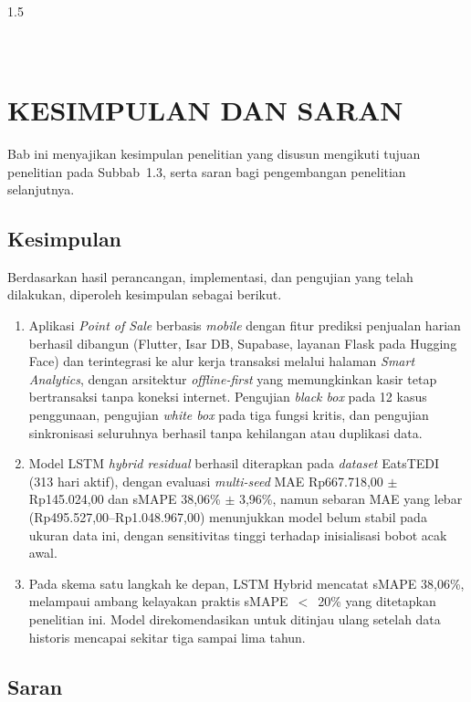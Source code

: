 \documentclass[12pt, a4paper, onecolumn, oneside]{report}
\begin{document}
\begin{spacing}{1.5}
\chapter[KESIMPULAN DAN SARAN]{\\ KESIMPULAN DAN SARAN}

Bab ini menyajikan kesimpulan penelitian yang disusun mengikuti tujuan penelitian pada Subbab~1.3, serta saran bagi pengembangan penelitian selanjutnya.

\section{Kesimpulan}

Berdasarkan hasil perancangan, implementasi, dan pengujian yang telah dilakukan, diperoleh kesimpulan sebagai berikut.
\begin{enumerate}
    \item Aplikasi \textit{Point of Sale} berbasis \textit{mobile} dengan fitur prediksi penjualan harian berhasil dibangun (Flutter, Isar DB, Supabase, layanan Flask pada Hugging Face) dan terintegrasi ke alur kerja transaksi melalui halaman \textit{Smart Analytics}, dengan arsitektur \textit{offline-first} yang memungkinkan kasir tetap bertransaksi tanpa koneksi internet. Pengujian \textit{black box} pada 12 kasus penggunaan, pengujian \textit{white box} pada tiga fungsi kritis, dan pengujian sinkronisasi seluruhnya berhasil tanpa kehilangan atau duplikasi data.

    \item Model LSTM \textit{hybrid residual} berhasil diterapkan pada \textit{dataset} EatsTEDI (313 hari aktif), dengan evaluasi \textit{multi-seed} MAE Rp667.718,00 $\pm$ Rp145.024,00 dan sMAPE 38,06\% $\pm$ 3,96\%, namun sebaran MAE yang lebar (Rp495.527,00--Rp1.048.967,00) menunjukkan model belum stabil pada ukuran data ini, dengan sensitivitas tinggi terhadap inisialisasi bobot acak awal.

    \item Pada skema satu langkah ke depan, LSTM Hybrid mencatat sMAPE 38,06\%, melampaui ambang kelayakan praktis sMAPE~$<$~20\% yang ditetapkan penelitian ini. Model direkomendasikan untuk ditinjau ulang setelah data historis mencapai sekitar tiga sampai lima tahun.
\end{enumerate}

\section{Saran}


\end{spacing}
\end{document}
